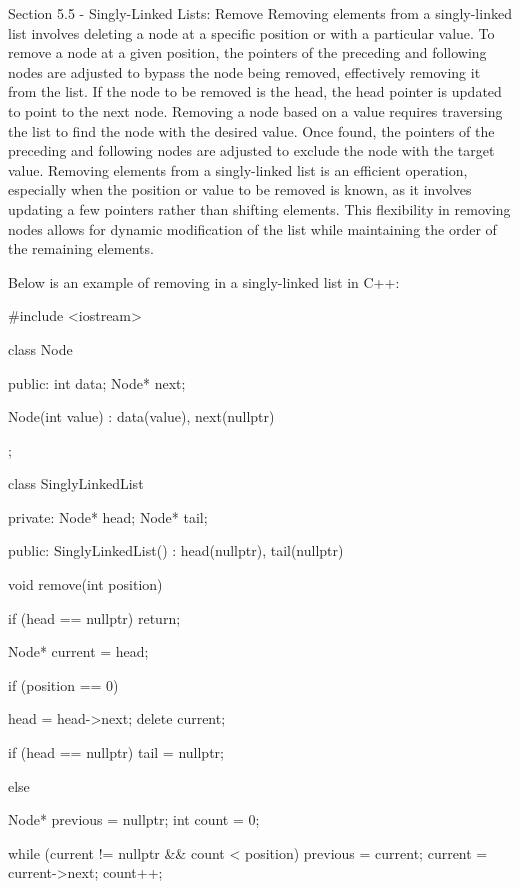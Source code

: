 \begin{notes}{Section 5.5 - Singly-Linked Lists: Remove}
    Removing elements from a singly-linked list involves deleting a node at a specific position or with a particular value. To remove a node at a given position, the pointers of the preceding and following nodes are adjusted to bypass the node being removed, effectively 
    removing it from the list. If the node to be removed is the head, the head pointer is updated to point to the next node. Removing a node based on a value requires traversing the list to find the node with the desired value. Once found, the pointers of the preceding 
    and following nodes are adjusted to exclude the node with the target value. Removing elements from a singly-linked list is an efficient operation, especially when the position or value to be removed is known, as it involves updating a few pointers rather than shifting 
    elements. This flexibility in removing nodes allows for dynamic modification of the list while maintaining the order of the remaining elements.
    
    \begin{highlight}
        Below is an example of removing in a singly-linked list in C++:
    
    \begin{code}[C++]
    #include <iostream>

    class Node {
    public:
        int data;
        Node* next;
    
        Node(int value) : data(value), next(nullptr) {}
    };
    
    class SinglyLinkedList {
    private:
        Node* head;
        Node* tail;
    
    public:
        SinglyLinkedList() : head(nullptr), tail(nullptr) {}
    
        void remove(int position) {
            if (head == nullptr)
                return;
    
            Node* current = head;
    
            if (position == 0) {
                head = head->next;
                delete current;
    
                if (head == nullptr)
                    tail = nullptr;
            } else {
                Node* previous = nullptr;
                int count = 0;
    
                while (current != nullptr && count < position) {
                    previous = current;
                    current = current->next;
                    count++;
                }
    
}}}
\end{code}
\end{highlight}
\end{notes}
